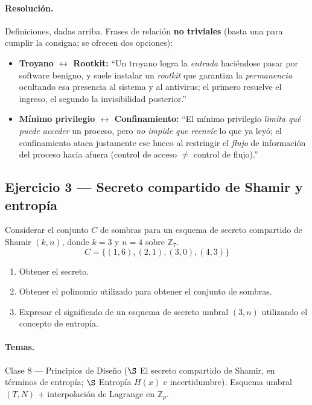 \paragraph{Resolución.}
Definiciones, dadas arriba. Frases de relación \textbf{no triviales} (basta una para cumplir la
consigna; se ofrecen dos opciones):
\begin{itemize}
  \item \textbf{Troyano $\leftrightarrow$ Rootkit:} ``Un troyano logra la \emph{entrada}
        haciéndose pasar por software benigno, y suele instalar un \emph{rootkit} que garantiza
        la \emph{permanencia} ocultando esa presencia al sistema y al antivirus; el primero
        resuelve el ingreso, el segundo la invisibilidad posterior.''
  \item \textbf{Mínimo privilegio $\leftrightarrow$ Confinamiento:} ``El mínimo privilegio
        \emph{limita qué puede acceder} un proceso, pero \emph{no impide que reenvíe} lo que ya
        leyó; el confinamiento ataca justamente ese hueco al restringir el \emph{flujo} de
        información del proceso hacia afuera (control de acceso $\neq$ control de flujo).''
\end{itemize}

\subsection{Ejercicio 3 --- Secreto compartido de Shamir y entropía}

\begin{consigna}
Considerar el conjunto $C$ de sombras para un esquema de secreto compartido de Shamir $(k,n)$,
donde $k=3$ y $n=4$ sobre $\mathbb{Z}_7$.
\[
  C = \{(1,6),(2,1),(3,0),(4,3)\}
\]
\begin{enumerate}[label=\textbf{\alph*)}]
  \item Obtener el secreto.
  \item Obtener el polinomio utilizado para obtener el conjunto de sombras.
  \item Expresar el significado de un esquema de secreto umbral $(3,n)$ utilizando el concepto
        de entropía.
\end{enumerate}
\end{consigna}

\paragraph{Temas.}
Clase 8 --- Principios de Diseño ($\S$ El secreto compartido de Shamir, en términos de
entropía; $\S$ Entropía $H(x)$ e incertidumbre). Esquema umbral $(T,N)$ + interpolación de
Lagrange en $\mathbb{Z}_p$.

